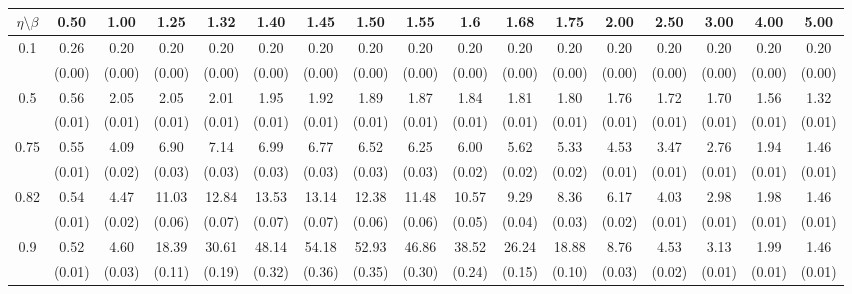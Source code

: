 \documentclass[12pt]{article}  %
\theoremstyle{plain}
\begin{document}
\begin{sidewaystable}[htbp]
\centering
{} 
\label{ATS_10-7}
\ \\
\begin{tabular}{ccccccccccccccccc}
\hline
$\eta \setminus \beta $        & 0.50   & 1.00   & 1.25   & 1.32   & 1.40   & 1.45   & 1.50   & 1.55   & 1.6   & 1.68   & 1.75   & 2.00   & 2.50   & 3.00   & 4.00  &5.00 \\ \hline
\multirow{2}{*}{0.1}  & 0.26& 0.20&  0.20 & 0.20 &  0.20  & 0.20  & 0.20 &  0.20  & 0.20 &  0.20 & 0.20 & 0.20 & 0.20&  0.20 & 0.20 & 0.20\\
                      & (0.00) & (0.00) & (0.00) & (0.00) & (0.00) & (0.00) & (0.00) & (0.00) & (0.00) & (0.00) & (0.00) & (0.00) & (0.00) & (0.00) & (0.00) & (0.00)\\ \hline
\multirow{2}{*}{0.5}  & 0.56& 2.05 & 2.05&  2.01  & 1.95 &  1.92  & 1.89  & 1.87  & 1.84 &  1.81 & 1.80 & 1.76 & 1.72 & 1.70 & 1.56 & 1.32 \\
                      & (0.01) & (0.01) & (0.01) & (0.01) & (0.01) & (0.01) & (0.01) & (0.01) & (0.01) & (0.01) & (0.01) & (0.01)  & (0.01) & (0.01) & (0.01)&(0.01)\\ \hline
\multirow{2}{*}{0.75}  & 0.55& 4.09 & 6.90 & 7.14 &  6.99 &  6.77  & 6.52 &  6.25 &  6.00  & 5.62 & 5.33 & 4.53 & 3.47 & 2.76 & 1.94 & 1.46\\
                      & (0.01)&    (0.02)& (0.03)& (0.03)& (0.03)& (0.03)& (0.03)& (0.03)& (0.02)&  (0.02)&  (0.02)&  (0.01)&  (0.01)&  (0.01)&  (0.01) & (0.01)\\ \hline
\multirow{2}{*}{0.82}  & 0.54 &4.47 &11.03 &12.84 & 13.53 & 13.14&  12.38 & 11.48&  10.57  & 9.29 & 8.36  &6.17 & 4.03 & 2.98&  1.98 & 1.46\\
                      & (0.01)&   (0.02)& (0.06)& (0.07)& (0.07)& (0.07)& (0.06)& (0.06)& (0.05)&  (0.04)&  (0.03)&  (0.02)&  (0.01)&  (0.01)&  (0.01)& (0.01)\\ \hline
\multirow{2}{*}{0.9}  &0.52& 4.60 &18.39 &30.61 & 48.14 & 54.18 & 52.93 & 46.86 & 38.52 & 26.24& 18.88&  8.76 & 4.53 & 3.13 & 1.99 & 1.46\\
                      & (0.01)&   (0.03)& (0.11)& (0.19)& (0.32)& (0.36)& (0.35)& (0.30)& (0.24)&  (0.15)&  (0.10)&  (0.03)&  (0.02)& (0.01)& (0.01)& (0.01)\\ \hline                                               

\end{tabular}
\end{sidewaystable}
\end{document}
